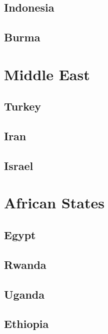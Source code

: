 \subsection*{Indonesia}

\subsection*{Burma}

\section{Middle East}

\subsection*{Turkey}

\subsection*{Iran}

\subsection*{Israel}

\section{African States}

\subsection*{Egypt}

\subsection*{Rwanda}

\subsection*{Uganda}

\subsection*{Ethiopia}

